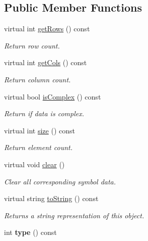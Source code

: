 \subsection*{Public Member Functions}
\begin{DoxyCompactItemize}
\item 
virtual int \hyperlink{class_g_e_symbol_a470e7764dc5d1a68e991fd75f64861e9}{get\-Rows} () const 
\begin{DoxyCompactList}\small\item\em Return row count. \end{DoxyCompactList}\item 
virtual int \hyperlink{class_g_e_symbol_a39fa2193c2edfdd0fb062472fd4a445d}{get\-Cols} () const 
\begin{DoxyCompactList}\small\item\em Return column count. \end{DoxyCompactList}\item 
virtual bool \hyperlink{class_g_e_symbol_af65ad912b91392ff60dcfa002878a3c4}{is\-Complex} () const 
\begin{DoxyCompactList}\small\item\em Return if data is complex. \end{DoxyCompactList}\item 
virtual int \hyperlink{class_g_e_symbol_a9dfb28fc5c1a67658c5380d5fbdfbc24}{size} () const 
\begin{DoxyCompactList}\small\item\em Return element count. \end{DoxyCompactList}\item 
virtual void \hyperlink{class_g_e_symbol_a39d2e523aec771a73e1cc5d7a9618b88}{clear} ()
\begin{DoxyCompactList}\small\item\em Clear all corresponding symbol data. \end{DoxyCompactList}\item 
virtual string \hyperlink{class_g_e_symbol_ac79ba555226072d4b03f06e9f8bb6afb}{to\-String} () const 
\begin{DoxyCompactList}\small\item\em Returns a string representation of this object. \end{DoxyCompactList}\item 
\hypertarget{class_g_e_symbol_ad1959d131a38822003f597fb977d80e4}{int {\bfseries type} () const }\label{class_g_e_symbol_ad1959d131a38822003f597fb977d80e4}

\end{DoxyCompactItemize}
